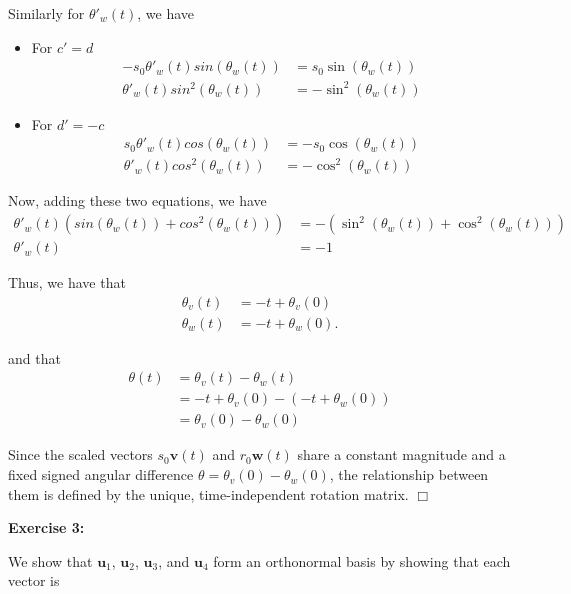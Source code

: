 \documentclass[12pt]{article}
\begin{document}
Similarly for $\theta'_w(t)$, we have
\begin{itemize}
    \item For $c' = d$
          \begin{align*}
              -s_0\theta'_w(t)sin(\theta_w(t)) & = s_0\sin(\theta_w(t)) \\
              \theta'_w(t)sin^2(\theta_w(t))   & = -\sin^2(\theta_w(t))
          \end{align*}
    \item For $d' = -c$
          \begin{align*}
              s_0\theta'_w(t)cos(\theta_w(t)) & = -s_0\cos(\theta_w(t)) \\
              \theta'_w(t)cos^2(\theta_w(t))  & = -\cos^2(\theta_w(t))
          \end{align*}
\end{itemize}

Now, adding these two equations, we have
\begin{align*}
    \theta'_w(t)(sin(\theta_w(t))+cos^2(\theta_w(t))) & = -(\sin^2(\theta_w(t)) + \cos^2(\theta_w(t))) \\
    \theta'_w(t)                                      & = -1
\end{align*}

Thus, we have that
\begin{align*}
    \theta_v(t) & = -t + \theta_v(0)  \\
    \theta_w(t) & = -t + \theta_w(0).
\end{align*}

and that
\begin{align*}
    \theta(t) & = \theta_v(t) - \theta_w(t)             \\
              & = -t + \theta_v(0) - (-t + \theta_w(0)) \\
              & = \theta_v(0) - \theta_w(0)
\end{align*}

Since the scaled vectors $s_0\mathbf{v}(t)$ and $r_0\mathbf{w}(t)$ share a constant magnitude and a fixed signed angular difference $\theta = \theta_v(0) - \theta_w(0)$, the relationship between them is defined by the unique, time-independent rotation matrix. $\Box{}$

\noindent{}\textbf{Exercise 3:}

We show that $\mathbf{u}_1$, $\mathbf{u}_2$, $\mathbf{u}_3$, and $\mathbf{u}_4$ form an orthonormal basis by showing that each vector is
\end{document}
